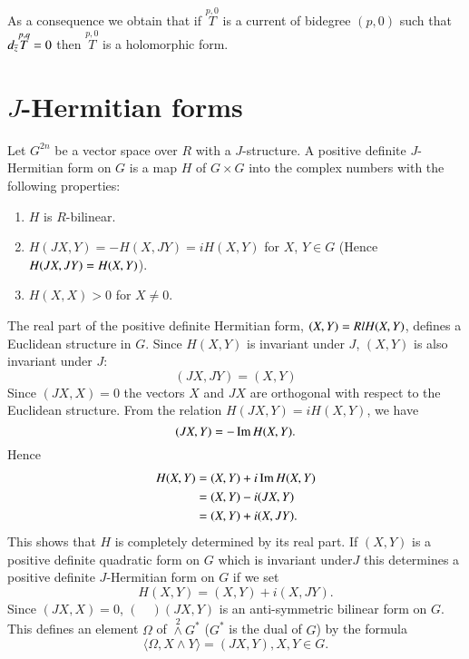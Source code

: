 As a consequence we obtain that if $\overset{p,0}{T}$ is a current of
bidegree $(p,0)$ such that $d_{\overline{z}}\overset{p,q}{T}=0$ then
$\overset{p,0}{T}$ is a holomorphic form. 

\section*{$J$-Hermitian forms}\pageoriginale

Let $G^{2n}$ be a vector space over $R$ with a $J$-structure. A
positive definite $J$-Hermitian form on $G$ is a map $H$ of $G\times
G$ into the complex numbers with the following properties:
\begin{enumerate}
\renewcommand{\labelenumi}{\theenumi)}
\item $H$ is $R$-bilinear.

\item $H(JX,Y)=-H(X,JY)=iH(X,Y)$ for $X$, $Y\in G$ (Hence
  $H(JX,\break JY) =H(X,Y)$).

\item $H(X,X)>0$ for $X\neq 0$. 
\end{enumerate}

The real part of the positive definite Hermitian form, $(X,Y)=Rl\break
  H(X,Y)$, defines a Euclidean structure in $G$. Since $H(X,Y)$ is
invariant under $J$, $(X,Y)$ is also invariant under $J$:
$$
(JX,JY)=(X,Y)
$$
Since $(JX,X)=0$ the vectors $X$ and $JX$ are orthogonal with respect
to the Euclidean structure. From the relation $H(JX,Y)=iH(X,Y)$, we
have
$$
(JX,Y)=-\operatorname{Im} H(X,Y).
$$
Hence
\begin{align*}
H(X,Y) &= (X,Y)+i\operatorname{Im} H(X,Y)\\
&= (X,Y)-i(JX,Y)\\
&= (X,Y)+i(X,JY).
\end{align*}
This shows that $H$ is completely determined by its real part. If
$(X,Y)$ is a positive definite quadratic form on $G$ which is
invariant under\pageoriginale $J$ this determines a positive definite
$J$-Hermitian form on $G$ if we set
$$
H(X,Y)=(X,Y)+i(X,JY).
$$
Since $(JX,X)=0$, $(\quad)(JX,Y)$ is an anti-symmetric bilinear form
on $G$. This defines an element $\Omega$ of $\overset{2}{\wedge}
G^{\ast}$ ($G^{\ast}$ is the dual of $G$) by the formula
$$
\langle\Omega,X\wedge Y\rangle=(JX,Y),X,Y\in G.
$$

